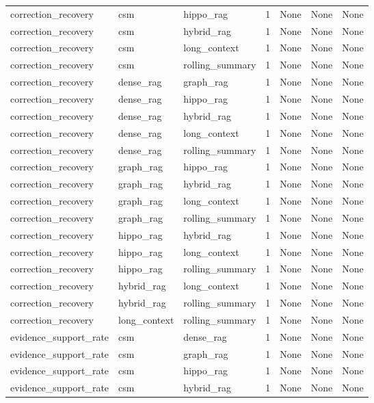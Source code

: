 \begin{tabular}{lllllll}
correction\_recovery & csm & hippo\_rag & 1 & None & None & None \\
correction\_recovery & csm & hybrid\_rag & 1 & None & None & None \\
correction\_recovery & csm & long\_context & 1 & None & None & None \\
correction\_recovery & csm & rolling\_summary & 1 & None & None & None \\
correction\_recovery & dense\_rag & graph\_rag & 1 & None & None & None \\
correction\_recovery & dense\_rag & hippo\_rag & 1 & None & None & None \\
correction\_recovery & dense\_rag & hybrid\_rag & 1 & None & None & None \\
correction\_recovery & dense\_rag & long\_context & 1 & None & None & None \\
correction\_recovery & dense\_rag & rolling\_summary & 1 & None & None & None \\
correction\_recovery & graph\_rag & hippo\_rag & 1 & None & None & None \\
correction\_recovery & graph\_rag & hybrid\_rag & 1 & None & None & None \\
correction\_recovery & graph\_rag & long\_context & 1 & None & None & None \\
correction\_recovery & graph\_rag & rolling\_summary & 1 & None & None & None \\
correction\_recovery & hippo\_rag & hybrid\_rag & 1 & None & None & None \\
correction\_recovery & hippo\_rag & long\_context & 1 & None & None & None \\
correction\_recovery & hippo\_rag & rolling\_summary & 1 & None & None & None \\
correction\_recovery & hybrid\_rag & long\_context & 1 & None & None & None \\
correction\_recovery & hybrid\_rag & rolling\_summary & 1 & None & None & None \\
correction\_recovery & long\_context & rolling\_summary & 1 & None & None & None \\
evidence\_support\_rate & csm & dense\_rag & 1 & None & None & None \\
evidence\_support\_rate & csm & graph\_rag & 1 & None & None & None \\
evidence\_support\_rate & csm & hippo\_rag & 1 & None & None & None \\
evidence\_support\_rate & csm & hybrid\_rag & 1 & None & None & None \\

\end{tabular}
